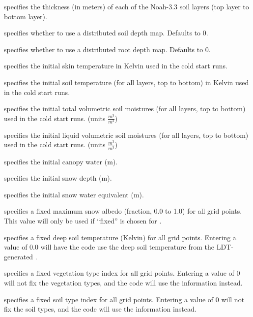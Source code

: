  specifies the thickness (in meters)
 of each of the Noah-3.3 soil layers (top layer to bottom layer).

  specifies whether
 to use a distributed soil depth map. Defaults to 0.

  specifies whether
 to use a distributed root depth map. Defaults to 0.

 specifies the initial skin temperature in Kelvin used in the
 cold start runs.

 specifies the initial soil temperature (for all layers,
 top to bottom) in Kelvin used in the cold start runs.

  specifies the
 initial total volumetric soil moistures (for all layers,
 top to bottom) used in the cold start runs.
 (units $\frac{m^3}{m^3}$)

  specifies the
 initial liquid volumetric soil moistures (for all layers,
 top to bottom) used in the cold start runs.
 (units $\frac{m^3}{m^3}$)

  specifies the initial
 canopy water (m).

  specifies the initial
 snow depth (m).

  specifies the initial
 snow water equivalent (m).

  specifies a fixed maximum
 snow albedo (fraction, 0.0 to 1.0) for all grid points.  This
 value will only be used if ``fixed'' is chosen for
 .

  specifies a fixed
 deep soil temperature (Kelvin) for all grid points.  Entering
 a value of 0.0 will have the code use the deep soil temperature
 from the LDT-generated .

  specifies a fixed
 vegetation type index for all grid points.  Entering a value
 of 0 will not fix the vegetation types, and the code will use
 the  information instead.

  specifies a fixed soil
 type index for all grid points.  Entering a value of 0
 will not fix the soil types, and the code will use the
  information instead.

